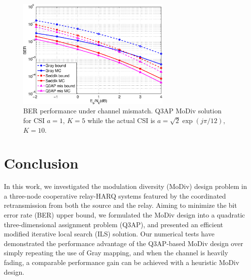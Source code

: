 \documentclass[journal,draftcls,onecolumn,12pt,twoside]{IEEEtran}
\begin{document}
\begin{figure}[!t]
    \centering
    \includegraphics[width=3.0in]{./figs/mismatch.eps}
    \caption{BER performance under channel mismatch. Q3AP MoDiv solution for
    CSI
    $a=1$, $K=5$ while the actual CSI is $a = \sqrt{2}\exp(j\pi/12)$, $K
    = 10$.}
    \label{fig:mismatch}
\end{figure}

\section{Conclusion}
\label{sec:conclusion}
In this work, we investigated the modulation diversity (MoDiv) design problem in
a three-node cooperative relay-HARQ systems featured by the coordinated
retransmission from both the source and the relay. Aiming to minimize the bit
error rate (BER) upper bound, we formulated the MoDiv design into a quadratic
three-dimensional assignment problem (Q3AP), and presented an efficient modified
iterative local search (ILS) solution. Our numerical tests have demonstrated the
performance advantage of the Q3AP-based MoDiv design over simply repeating the
use of Gray mapping, and when the channel is heavily fading, a comparable
performance gain can be achieved with a heuristic MoDiv design. 









\end{document}
